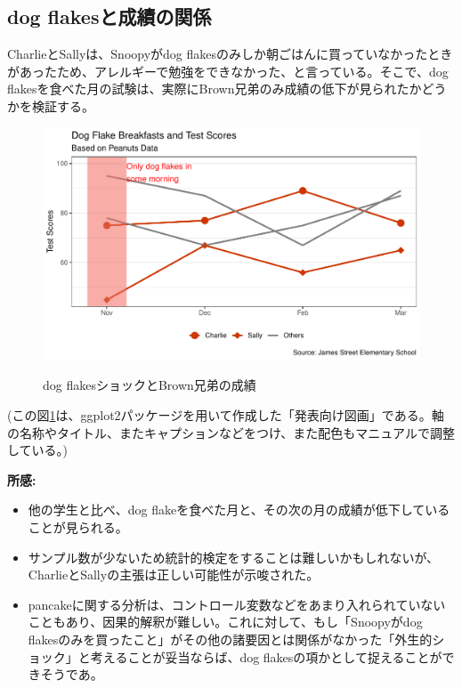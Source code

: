 \documentclass[xelatex,ja=standard]{bxjsarticle}
\begin{document}
\subsection{dog flakesと成績の関係}

CharlieとSallyは、Snoopyがdog flakesのみしか朝ごはんに買っていなかったときがあったため、アレルギーで勉強をできなかった、と言っている。そこで、dog flakesを食べた月の試験は、実際にBrown兄弟のみ成績の低下が見られたかどうかを検証する。

\begin{figure}[h]
\centering
\includegraphics[width=12cm]{00_cover/dogflakes.pdf}
\label{fig:img2}
\caption{dog flakesショックとBrown兄弟の成績}
\end{figure}

(この図\ref{fig:img2}は、ggplot2パッケージを用いて作成した「発表向け図画」である。軸の名称やタイトル、またキャプションなどをつけ、また配色もマニュアルで調整している。)

\textbf{所感:}
\begin{itemize}
\item 他の学生と比べ、dog flakeを食べた月と、その次の月の成績が低下していることが見られる。
\item サンプル数が少ないため統計的検定をすることは難しいかもしれないが、CharlieとSallyの主張は正しい可能性が示唆された。
\item pancakeに関する分析は、コントロール変数などをあまり入れられていないこともあり、因果的解釈が難しい。これに対して、もし「Snoopyがdog flakesのみを買ったこと」がその他の諸要因とは関係がなかった「外生的ショック」と考えることが妥当ならば、dog flakesの項かとして捉えることができそうであ。

\end{itemize}

\newpage

 

%
\end{document}
